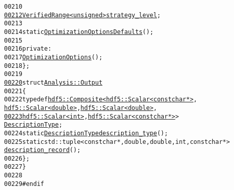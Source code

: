 \begin{footnotesize}
\begin{alltt}
00210 
\hypertarget{analysis_8hh_source_l00212}{}\hyperlink{structeos_1_1Analysis_1_1OptimizationOptions_ad31144d330b6897a432d0a02f1ebe027}{00212}                 \hyperlink{classeos_1_1VerifiedRange}{VerifiedRange<unsigned>} \hyperlink{structeos_1_1Analysis_1_1OptimizationOptions_ad31144d330b6897a432d0a02f1ebe027}{strategy_level};
00213 
00214                 \textcolor{keyword}{static} \hyperlink{structeos_1_1Analysis_1_1OptimizationOptions}{OptimizationOptions} \hyperlink{structeos_1_1Analysis_1_1OptimizationOptions_a809f9cf0f5d544c7303a631c278c3fa1}{Defaults}();
00215 
00216             \textcolor{keyword}{private}:
00217                 \hyperlink{structeos_1_1Analysis_1_1OptimizationOptions}{OptimizationOptions}();
00218         \};
00219 
\hypertarget{analysis_8hh_source_l00220}{}\hyperlink{structeos_1_1Analysis_1_1Output}{00220}      \textcolor{keyword}{struct }\hyperlink{structeos_1_1Analysis_1_1Output}{Analysis::Output}
00221      \{
00222          \textcolor{keyword}{typedef} \hyperlink{classeos_1_1hdf5_1_1Composite}{hdf5::Composite<hdf5::Scalar<const char *>}, 
      \hyperlink{classeos_1_1hdf5_1_1Scalar}{hdf5::Scalar<double>}, \hyperlink{classeos_1_1hdf5_1_1Scalar}{hdf5::Scalar<double>},
\hypertarget{analysis_8hh_source_l00223}{}\hyperlink{structeos_1_1Analysis_1_1Output_a87e1877031ee1d537773b3dad303dd87}{00223}                                  \hyperlink{classeos_1_1hdf5_1_1Scalar}{hdf5::Scalar<int>}, \hyperlink{classeos_1_1hdf5_1_1Scalar}{hdf5::Scalar<const char *>}> 
      \hyperlink{classeos_1_1hdf5_1_1Composite}{DescriptionType};
00224          \textcolor{keyword}{static} \hyperlink{classeos_1_1hdf5_1_1Composite}{DescriptionType} \hyperlink{structeos_1_1Analysis_1_1Output_afe79cdeca03867008ffebb0796600b6a}{description_type}();
00225          \textcolor{keyword}{static} std::tuple<const char *, double, double, int, const char *> 
      \hyperlink{structeos_1_1Analysis_1_1Output_aef0dc96dd006ae72050dc34ac745df15}{description_record}();
00226      \};
00227 \}
00228 
00229 \textcolor{preprocessor}{#endif}
\end{alltt}\end{footnotesize}
